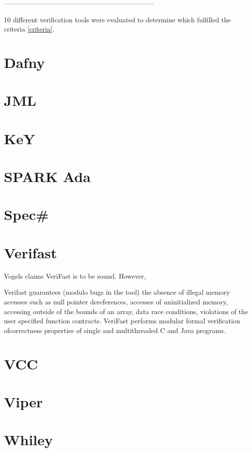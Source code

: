 \documentclass[12pt,openany,a4paper]{book}
\begin{document}
------------------------------------------------------------------

10 different verification tools were evaluated to determine which fulfilled the criteria \ref{criteria}.

\section {Dafny}



\section {JML}
\section {KeY}
\section {SPARK Ada}
\section {Spec\#}
\section {Verifast}
Vogels claims VeriFast is to be sound. However, 

Verifast guarantees (modulo bugs in the tool) the absence of illegal memory accesses such as null pointer dereferences, accesses of uninitialized memory, accessing outside of the bounds of an array, data race conditions, violations of the user specified function contracts.
VeriFast performs modular formal verification ofcorrectness properties of single and multithreaded C and Java programs. \\

\section {VCC}
\section {Viper}
\section {Whiley}
\end{document}
